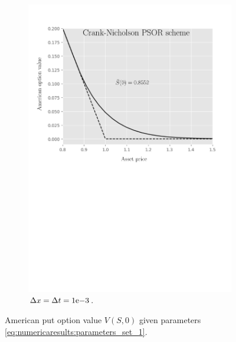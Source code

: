 \begin{figure}[tbp]
\begin{subfigure}{0.4\textwidth}
    \includegraphics[width=\textwidth]{chapters/chapter5/TestCase2CrankNicholsonLCP.pdf}
    \caption{$\Delta{x}=\Delta{t}={1}\mathrm{e}{-3}$.}
  \end{subfigure}
  \caption{American put option value $V(S, 0)$ given parameters \eqref{eq:numericaresults:parameters_set_1}.}
  \label{fig:lcp:numericaresults:test_case_2}
\end{figure}

